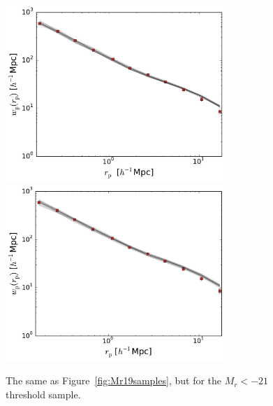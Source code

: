 \documentclass[usenatbib,usegraphicx,letterpaper]{mn2e}
\begin{document}
\begin{figure}
\begin{center}
\includegraphics[width=8.3cm]{Mr21samples.pdf}
\includegraphics[width=8.3cm]{Mr21ABsamples.pdf}
\caption{
The same as Figure~\ref{fig:Mr19samples}, but for the $M_r<-21$ threshold sample.
}
\label{fig:Mr21samples}
\end{center}
\end{figure}
\end{document}
